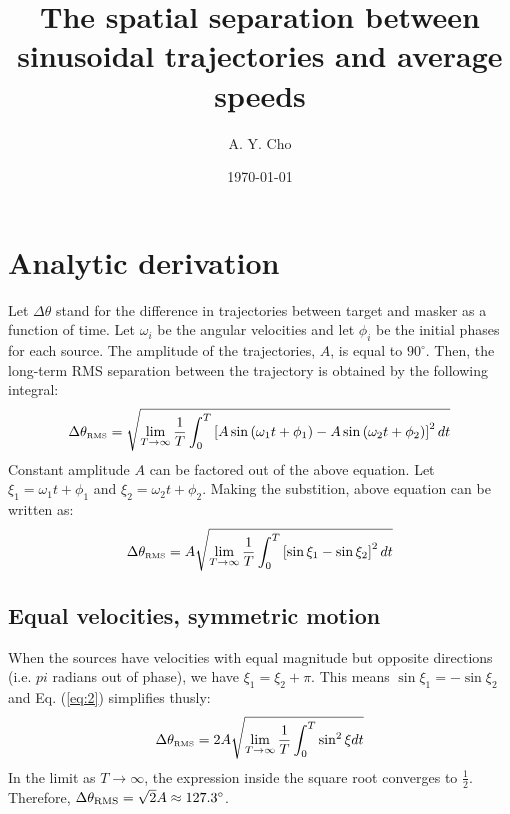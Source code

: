\documentclass[12pt]{article}
\title{The spatial separation between sinusoidal trajectories and average speeds}
\author{A. Y. Cho}
\date{\today}
\begin{document}
\maketitle

\section{Analytic derivation}
Let $\Delta\theta$ stand for the difference in trajectories between target and masker as a function of time. Let $\omega_i$ be the angular velocities and let $\phi_i$ be the initial phases for each source. The amplitude of the trajectories, $A$, is equal to $90^{\circ}$. Then, the long-term RMS separation between the trajectory is obtained by the following integral:
\begin{equation}\label{eq:1}
  \Delta\theta_{\textrm{\tiny RMS}} = \sqrt{ \lim_{T \to \infty} \frac{1}{T} \int^{T}_0 \left[A\sin{\left(\omega_1 t + \phi_1 \right)} - A\sin{\left(\omega_2 t + \phi_2 \right)} \right]^2 dt}
\end{equation}
Constant amplitude $A$ can be factored out of the above equation. Let $\xi_1 = \omega_1 t + \phi_1$ and $\xi_2 = \omega_2 t + \phi_2$. Making the substition, above equation can be written as:
\begin{equation}\label{eq:2}
  \Delta\theta_{\textrm{\tiny RMS}} = A \sqrt{ \lim_{T \to \infty} \frac{1}{T} \int^{T}_0 \left[\sin{\xi_1} - \sin{\xi_2} \right]^2 dt}
\end{equation}

\subsection{Equal velocities, symmetric motion}
When the sources have velocities with equal magnitude but opposite directions (i.e. $pi$ radians out of phase), we have $\xi_1 = \xi_2 + \pi$. This means $\sin{\xi_1} = -\sin{\xi_2}$ and Eq. (\ref{eq:2}) simplifies thusly:
\begin{equation}
  \Delta\theta_{\textrm{\tiny RMS}} = 2A \sqrt{ \lim_{T \to \infty} \frac{1}{T} \int^{T}_0 \sin^2{\xi} dt}
\end{equation}
In the limit as $T \to \infty$, the expression inside the square root converges to $\frac{1}{2}$. Therefore, $\Delta\theta_{\tiny \textrm{RMS}} = \sqrt{2}A \approx 127.3^{\circ}$.
\end{document}
